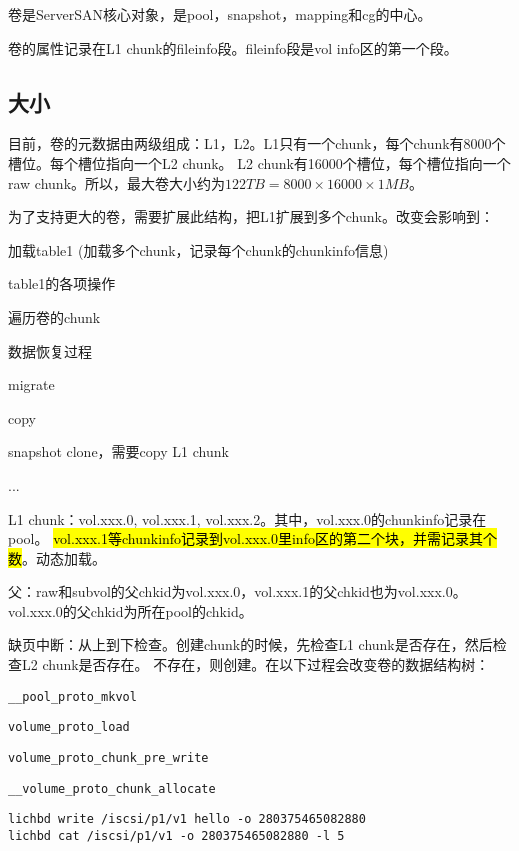 卷是ServerSAN核心对象，是pool，snapshot，mapping和cg的中心。

卷的属性记录在L1 chunk的fileinfo段。fileinfo段是vol info区的第一个段。

\subsection{大小}

目前，卷的元数据由两级组成：L1，L2。L1只有一个chunk，每个chunk有8000个槽位。每个槽位指向一个L2 chunk。
L2 chunk有16000个槽位，每个槽位指向一个raw chunk。所以，最大卷大小约为$122TB = 8000 \times 16000 \times 1MB$。

为了支持更大的卷，需要扩展此结构，把L1扩展到多个chunk。改变会影响到：
\begin{compactitem}
\item 加载table1 (加载多个chunk，记录每个chunk的chunkinfo信息)
\item table1的各项操作
\item 遍历卷的chunk
\item 数据恢复过程
\item migrate
\item copy
\item snapshot clone，需要copy L1 chunk
\item ...
\end{compactitem}

L1 chunk：vol.xxx.0, vol.xxx.1, vol.xxx.2。其中，vol.xxx.0的chunkinfo记录在pool。
\hl{vol.xxx.1等chunkinfo记录到vol.xxx.0里info区的第二个块，并需记录其个数}。动态加载。

父：raw和subvol的父chkid为vol.xxx.0，vol.xxx.1的父chkid也为vol.xxx.0。vol.xxx.0的父chkid为所在pool的chkid。

缺页中断：从上到下检查。创建chunk的时候，先检查L1 chunk是否存在，然后检查L2 chunk是否存在。
不存在，则创建。在以下过程会改变卷的数据结构树：
\begin{compactitem}
\item \verb|__pool_proto_mkvol|
\item \verb|volume_proto_load|
\item \verb|volume_proto_chunk_pre_write|
\item \verb|__volume_proto_chunk_allocate|
\end{compactitem}

\begin{lstlisting}[frame=single]
lichbd write /iscsi/p1/v1 hello -o 280375465082880
lichbd cat /iscsi/p1/v1 -o 280375465082880 -l 5
\end{lstlisting}


